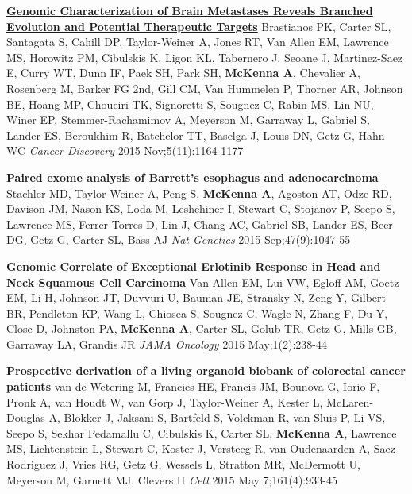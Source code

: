 \documentclass[9pt]{article}
\begin{document}
\noindent\href{https://www.ncbi.nlm.nih.gov/pubmed/26410082}{\bf  Genomic Characterization of Brain Metastases Reveals Branched Evolution and Potential Therapeutic Targets}\vspace{-0.03in}
\newline\noindent Brastianos PK, Carter SL, Santagata S, Cahill DP, Taylor-Weiner A, Jones RT, Van Allen EM, Lawrence MS, Horowitz PM, Cibulskis K, Ligon KL, Tabernero J, Seoane J, Martinez-Saez E, Curry WT, Dunn IF, Paek SH, Park SH, \textbf{McKenna A}, Chevalier A, Rosenberg M, Barker FG 2nd, Gill CM, Van Hummelen P, Thorner AR, Johnson BE, Hoang MP, Choueiri TK, Signoretti S, Sougnez C, Rabin MS, Lin NU, Winer EP, Stemmer-Rachamimov A, Meyerson M, Garraway L, Gabriel S, Lander ES, Beroukhim R, Batchelor TT, Baselga J, Louis DN, Getz G, Hahn WC
\newline\noindent\emph{ Cancer Discovery} 2015 Nov;5(11):1164-1177
\bigskip

\noindent\href{https://www.ncbi.nlm.nih.gov/pubmed/26192918}{\bf  Paired exome analysis of Barrett's esophagus and adenocarcinoma}\vspace{-0.03in}
\newline\noindent Stachler MD, Taylor-Weiner A, Peng S, \textbf{McKenna A}, Agoston AT, Odze RD, Davison  JM, Nason KS, Loda M, Leshchiner I, Stewart C, Stojanov P, Seepo S, Lawrence MS,  Ferrer-Torres D, Lin J, Chang AC, Gabriel SB, Lander ES, Beer DG, Getz G, Carter  SL, Bass AJ
\newline\noindent\emph{ Nat Genetics} 2015 Sep;47(9):1047-55
\bigskip

\noindent\href{https://www.ncbi.nlm.nih.gov/pubmed/26181029}{\bf  Genomic Correlate of Exceptional Erlotinib Response in Head and Neck Squamous Cell Carcinoma}\vspace{-0.03in}
\newline\noindent Van Allen EM, Lui VW, Egloff AM, Goetz EM, Li H, Johnson JT, Duvvuri U, Bauman JE, Stransky N, Zeng Y, Gilbert BR, Pendleton KP, Wang L, Chiosea S, Sougnez C, Wagle N, Zhang F, Du Y, Close D, Johnston PA, \textbf{McKenna A}, Carter SL, Golub TR, Getz G, Mills GB, Garraway LA, Grandis JR
\newline\noindent\emph{ JAMA Oncology} 2015 May;1(2):238-44
\bigskip

\noindent\href{https://www.ncbi.nlm.nih.gov/pubmed/25957691}{\bf  Prospective derivation of a living organoid biobank of colorectal cancer patients}\vspace{-0.03in}
\newline\noindent van de Wetering M, Francies HE, Francis JM, Bounova G, Iorio F, Pronk A, van Houdt W, van Gorp J, Taylor-Weiner A, Kester L, McLaren-Douglas A, Blokker J, Jaksani S, Bartfeld S, Volckman R, van Sluis P, Li VS, Seepo S, Sekhar Pedamallu  C, Cibulskis K, Carter SL, \textbf{McKenna A}, Lawrence MS, Lichtenstein L, Stewart C, Koster J, Versteeg R, van Oudenaarden A, Saez-Rodriguez J, Vries RG, Getz G, Wessels L, Stratton MR, McDermott U, Meyerson M, Garnett MJ, Clevers H
\newline\noindent\emph{ Cell} 2015 May 7;161(4):933-45
\bigskip
\end{document}
